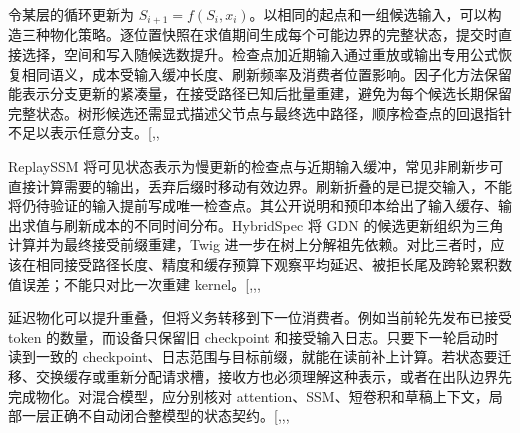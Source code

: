 \documentclass[
  a4paper,
  UTF8,
  fontset=none,
  zihao=5]{ctexart}
\begin{document}
令某层的循环更新为
\(S_{i+1}=f(S_i,x_i)\)。以相同的起点和一组候选输入，可以构造三种物化策略。逐位置快照在求值期间生成每个可能边界的完整状态，提交时直接选择，空间和写入随候选数提升。检查点加近期输入通过重放或输出专用公式恢复相同语义，成本受输入缓冲长度、刷新频率及消费者位置影响。因子化方法保留能表示分支更新的紧凑量，在接受路径已知后批量重建，避免为每个候选长期保留完整状态。树形候选还需显式描述父节点与最终选中路径，顺序检查点的回退指针不足以表示任意分支。{[},,\citeproc{ref-replayssm}{16}{]}

ReplaySSM
将可见状态表示为慢更新的检查点与近期输入缓冲，常见非刷新步可直接计算需要的输出，丢弃后缀时移动有效边界。刷新折叠的是已提交输入，不能将仍待验证的输入提前写成唯一检查点。其公开说明和预印本给出了输入缓存、输出求值与刷新成本的不同时间分布。HybridSpec
将 GDN 的候选更新组织为三角计算并为最终接受前缀重建，Twig
进一步在树上分解祖先依赖。对比三者时，应该在相同接受路径长度、精度和缓存预算下观察平均延迟、被拒长尾及跨轮累积数值误差；不能只对比一次重建
kernel。{[},,,\citeproc{ref-replayssm-blog}{64}{]}

延迟物化可以提升重叠，但将义务转移到下一位消费者。例如当前轮先发布已接受
token 的数量，而设备只保留旧 checkpoint
和接受输入日志。只要下一轮启动时读到一致的
checkpoint、日志范围与目标前缀，就能在读前补上计算。若状态要迁移、交换缓存或重新分配请求槽，接收方也必须理解这种表示，或者在出队边界先完成物化。对混合模型，应分别核对
attention、SSM、短卷积和草稿上下文，局部一层正确不自动闭合整模型的状态契约。{[},,,\citeproc{ref-pr-d2h}{31}{]}
\end{document}
